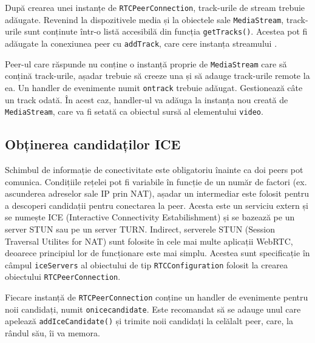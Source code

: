 \indent \par După crearea unei instanțe de \texttt{RTCPeerConnection}, track-urile de stream trebuie adăugate. Revenind la dispozitivele media și la obiectele sale \texttt{MediaStream}, track-urile sunt conținute într-o listă accesibilă din funcția \texttt{getTracks()}. Acestea pot fi adăugate la conexiunea peer cu \texttt{addTrack}, care cere instanța streamului \cite{WebStream2014}.
\indent \par Peer-ul care răspunde nu conține o instanță proprie de \texttt{MediaStream} care să conțină track-urile, așadar trebuie să creeze una și să adauge track-urile remote la ea. Un handler de evenimente numit \texttt{ontrack} trebuie adăugat. Gestionează câte un track odată. În acest caz, handler-ul va adăuga la instanța nou creată de \texttt{MediaStream}, care va fi setată ca obiectul sursă al elementului \texttt{video}.

\subsection{Obținerea candidaților ICE}
\label{sec:ch3sec4subsec4}

\indent \par Schimbul de informație de conectivitate este obligatoriu înainte ca doi peers pot comunica. Condițiile rețelei pot fi variabile în funcție de un număr de factori (ex. ascunderea adreselor sale IP prin NAT), așadar un intermediar este folosit pentru a descoperi candidații pentru conectarea la peer. Acesta este un serviciu extern și se numește ICE (Interactive Connectivity Estabilishment) și se bazează pe un server STUN sau pe un server TURN. Indirect, serverele STUN (Session Traversal Utilites for NAT) sunt folosite în cele mai multe aplicații WebRTC, deoarece principiul lor de funcționare este mai simplu. Acestea sunt specificație în câmpul \texttt{iceServers} al obiectului de tip \texttt{RTCConfiguration} folosit la crearea obiectului \texttt{RTCPeerConnection}.
\indent \par Fiecare instanță de \texttt{RTCPeerConnection} conține un handler de evenimente pentru noii candidați, numit \texttt{onicecandidate}. Este recomandat să se adauge unul care apelează \texttt{addIceCandidate()} și trimite noii candidați la celălalt peer, care, la rândul său, îi va memora.
